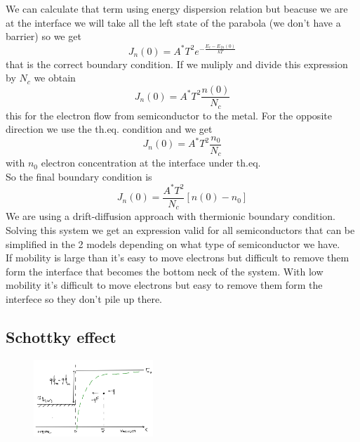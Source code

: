 We can calculate that term using energy dispersion relation but beacuse we are at the interface we will take all the left state of the parabola (we don't have a barrier) so we get 
\begin{equation}
J_n(0)=A^*T^2e^{-\frac{E_c-E_{fn}(0)}{kT}} 
\end{equation}
that is the correct boundary condition. If we muliply and divide this expression by $N_c$ we obtain
\begin{equation}
J_n(0)=A^*T^2 \frac{n(0)}{N_c}
\end{equation}
this for the electron flow from semiconductor to the metal. For the opposite direction we use the th.eq. condition and we get
\begin{equation}
J_n(0)=A^*T^2 \frac{n_0}{N_c}
\end{equation}
with $n_0$ electron concentration at the interface under th.eq.\\
So the final boundary condition is
\begin{equation}
J_n(0)=\frac{A^*T^2 }{N_c}[n(0)-n_0]
\end{equation}
We are using a drift-diffusion approach with thermionic boundary condition.\\
Solving this system we get an expression valid for all semiconductors that can be simplified in the 2 models depending on what type of semiconductor we have.\\
If mobility is large than it's easy to move electrons but difficult to remove them form the interface that becomes the bottom neck of the system. With low mobility it's difficult to move electrons but easy to remove them form the interfece so they don't pile up there.\\
\subsection{Schottky effect}
\begin{figure}
\includegraphics[width=0.4\textwidth]{scheff.png}
\end{figure}

